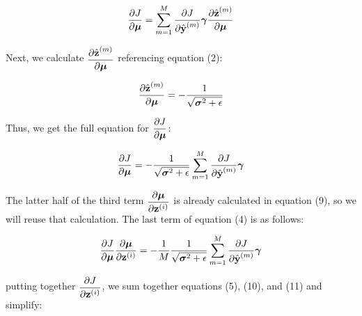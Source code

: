 \documentclass{article}
\begin{document}
\begin{multicols}{2}
\begin{equation}
    {\partial J \over \partial \boldsymbol{\mu}} = 
    \sum_{m=1}^M {\partial J \over \partial \hat{\textbf{y}}^{(m)}}
    \boldsymbol{\gamma}
    {\partial \hat{\textbf{z}}^{(m)} \over \partial \boldsymbol{\mu}} \notag
\end{equation}

Next, we calculate $\begin{aligned}
    {\partial \hat{\textbf{z}}^{(m)} \over \partial \boldsymbol{\mu}} 
\end{aligned}$ referencing equation (2):

\begin{equation}
    {\partial \hat{\textbf{z}}^{(m)} \over \partial \boldsymbol{\mu}} = 
    -{1 \over \sqrt{\boldsymbol{\sigma}^2 + \epsilon}} \notag
\end{equation}

Thus, we get the full equation for $\begin{aligned}
    {\partial J \over \partial \boldsymbol{\mu}}
\end{aligned}$:

\begin{equation}
    {\partial J \over \partial \boldsymbol{\mu}} = 
    -{1 \over \sqrt{\boldsymbol{\sigma}^2 + \epsilon}}
    \sum_{m=1}^M {\partial J \over \partial \hat{\textbf{y}}^{(m)}}
    \boldsymbol{\gamma} \notag
\end{equation}

The latter half of the third term $\begin{aligned}
    {\partial \boldsymbol{\mu}\over \partial \textbf{z}^{(i)}}
\end{aligned}$ is already calculated in equation (9), so we will reuse that
calculation. The last term of equation (4) is as follows:

\begin{equation}
    {\partial J \over \partial \boldsymbol{\mu}} 
    {\partial \boldsymbol{\mu} \over \partial \textbf{z}^{(i)}}
    =-{1\over M}{1 \over \sqrt{\boldsymbol{\sigma}^2 + \epsilon}}
    \sum_{m=1}^M {\partial J \over \partial \hat{\textbf{y}}^{(m)}}
    \boldsymbol{\gamma}
\end{equation}

putting together $\begin{aligned}
    {\partial J \over \partial \textbf{z}^{(i)}}
\end{aligned}$, we sum together equations (5), (10), and (11) and simplify:


\end{multicols}
\end{document}
